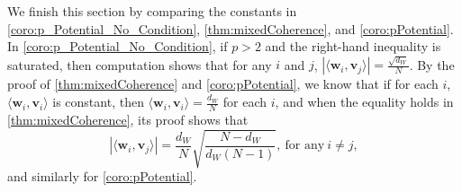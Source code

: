 \documentclass{amsart}
\numberwithin{equation}{section}
\theoremstyle{plain}
\theoremstyle{remark}
\theoremstyle{definition}
\begin{document}
We finish this section by comparing the constants in \cref{coro:p_Potential_No_Condition}, \cref{thm:mixedCoherence}, and \cref{coro:pPotential}. 
In \cref{coro:p_Potential_No_Condition}, if $p>2$ and the right-hand inequality is saturated, then computation shows that for any $ i$ and $j$, $ |\langle \mathbf{w}_i, \mathbf{v}_j \rangle| = \frac{\sqrt{d_W}}{N}$.
By the proof of \cref{thm:mixedCoherence} and \cref{coro:pPotential}, we know that if for each $i$,  $\langle \mathbf{w}_i, \mathbf{v}_i \rangle$ is constant, then $ \langle \mathbf{w}_i, \mathbf{v}_i \rangle =  \frac{d_W}{N}$ for each $i$,
and when the equality holds in \cref{thm:mixedCoherence}, its proof shows that
$$|\langle \mathbf{w}_i, \mathbf{v}_j \rangle | = \frac{d_W}{N}\sqrt{\frac{N-d_W}{d_W(N-1)}}, \ \text{for any} \ i \neq j,$$
and similarly for \cref{coro:pPotential}. 
\end{document}
